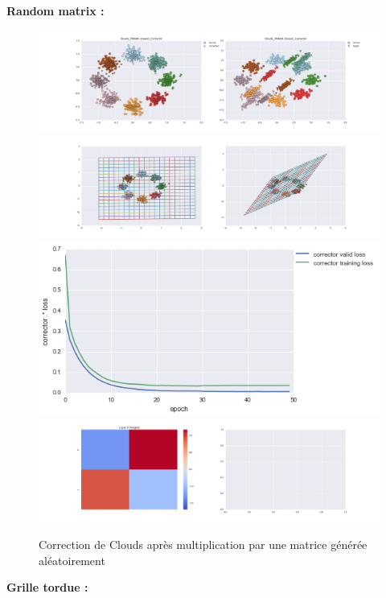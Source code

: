 {\Large \textbf{Random matrix :}}

\begin{figure}[H] %
\centering
\includegraphics[width=\linewidth]{fig/24-05-2016/clouds/Clouds_RMatK-closest_Corrector-DATA.png}
\includegraphics[width=\linewidth]{fig/24-05-2016/clouds/Clouds_RMatK-closest_Corrector-GridCheck.png}
\includegraphics[width=0.45\linewidth]{fig/24-05-2016/clouds/Clouds_RMatK-closest_Corrector-Learning_curve.png}
\includegraphics[width=\linewidth]{fig/24-05-2016/clouds/Clouds_RMatK-closest_Corrector-W.png}
\caption{Correction de Clouds après multiplication par une matrice générée aléatoirement}
\label{fig:recap-clouds-RMat-exhaustive}
\end{figure}

{\Large \textbf{Grille tordue :}}

